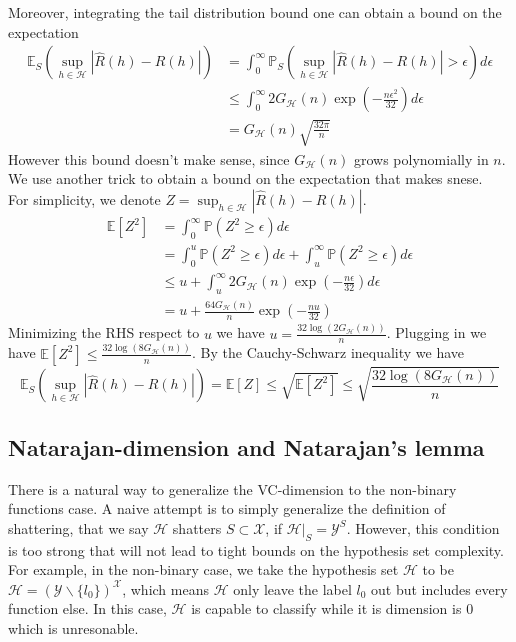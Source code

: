 Moreover, integrating the tail distribution bound one can obtain a bound on the expectation
\begin{align}
\mathbb{E}_S \left(\sup_{h \in \mathcal{H}}|\hat{R}(h)-R(h)| \right) &= \int_{0}^{\infty}  \mathbb{P}_S \left(\sup_{h \in \mathcal{H}}|\hat{R}(h)-R(h)|>\epsilon \right) d\epsilon \\
&\leq \int_{0}^{\infty} 2G_{\mathcal{H}}(n)\exp\left(-\frac{n\epsilon^2}{32} \right)d\epsilon\\
&=G_{\mathcal{H}}(n) \sqrt{\frac{32\pi}{n}}
\end{align}
However this bound doesn't make sense, since $G_{\mathcal{H}}(n)$ grows polynomially in $n$. We use another trick to obtain a bound on the expectation that makes snese.\\
For simplicity, we denote $Z=\sup_{h \in \mathcal{H}}|\hat{R}(h)-R(h)|$.
\begin{align}
\mathbb{E}[Z^2] &= \int_{0}^{\infty} \mathbb{P}(Z^2\geq \epsilon) d\epsilon \\
& = \int_{0}^{u} \mathbb{P}(Z^2\geq \epsilon) d\epsilon + \int_{u}^{\infty} \mathbb{P}(Z^2\geq \epsilon) d\epsilon \\
& \leq u+    \int_{u}^{\infty} 2G_{\mathcal{H}}(n) \exp\left(-\frac{n\epsilon}{32} \right) d\epsilon \\
& = u+\frac{64G_{\mathcal{H}}(n)}{n}\exp \left(-\frac{nu}{32}\right)
\end{align}
Minimizing the RHS respect to $u$ we have $u=\frac{32\log(2G_{\mathcal{H}}(n))}{n}$. Plugging in we have $\mathbb{E}[Z^2] \leq \frac{32\log(8G_{\mathcal{H}}(n))}{n}$.
By the Cauchy-Schwarz inequality we have 
\begin{equation}
\mathbb{E}_S \left(\sup_{h \in \mathcal{H}}|\hat{R}(h)-R(h)| \right)= \mathbb{E}[Z] \leq \sqrt{\mathbb{E}[Z^2]} \leq \sqrt{\frac{32\log(8G_{\mathcal{H}}(n))}{n}}
\end{equation}

\subsection{Natarajan-dimension and Natarajan's lemma}
There is a natural way to generalize the VC-dimension to the  non-binary functions case. A naive attempt is to simply generalize the definition of shattering, that we say $\mathcal{H}$ shatters $S \subset \mathcal{X}$, if $\mathcal{H}|_{S} = \mathcal{Y}^{S}$. However, this condition is too strong that will not lead to tight bounds on the hypothesis set complexity. For example, in the non-binary case, we take the hypothesis set $\mathcal{H}$ to be $\mathcal{H} = (\mathcal{Y} \backslash \{l_0\})^{\mathcal{X}}$, which means $\mathcal{H}$ only leave the label $l_0$ out but includes every function else. In this case, $\mathcal{H}$ is capable to classify while it is dimension is $0$ which is unresonable. 

